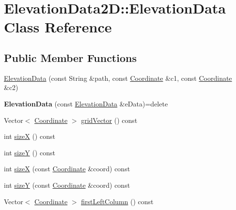 \hypertarget{classElevationData2D_1_1ElevationData}{}\section{Elevation\+Data2D\+:\+:Elevation\+Data Class Reference}
\label{classElevationData2D_1_1ElevationData}
\subsection*{Public Member Functions}
\begin{DoxyCompactItemize}
\item 
\mbox{\hyperlink{classElevationData2D_1_1ElevationData_ab6c477c8515de15f43e844c701c88f5b}{Elevation\+Data}} (const String \&path, const \mbox{\hyperlink{classElevationData2D_1_1Coordinate}{Coordinate}} \&c1, const \mbox{\hyperlink{classElevationData2D_1_1Coordinate}{Coordinate}} \&c2)
\item 
\mbox{\label{classElevationData2D_1_1ElevationData_a13b21b02c851a0521ba2591609158964}} 
{\bfseries Elevation\+Data} (const \mbox{\hyperlink{classElevationData2D_1_1ElevationData}{Elevation\+Data}} \&e\+Data)=delete
\item 
Vector$<$ \mbox{\hyperlink{classElevationData2D_1_1Coordinate}{Coordinate}} $>$ \mbox{\hyperlink{classElevationData2D_1_1ElevationData_af0514b1f341d0284e05547e3dd19b644}{grid\+Vector}} () const
\item 
int \mbox{\hyperlink{classElevationData2D_1_1ElevationData_a058ce71c9949c9bb0ce9a933a60dcc4d}{sizeX}} () const
\item 
int \mbox{\hyperlink{classElevationData2D_1_1ElevationData_af99f1d5cdcf994d9f8f3cc725f9393c2}{sizeY}} () const
\item 
int \mbox{\hyperlink{classElevationData2D_1_1ElevationData_a171ff10d701d61b375a8d9a4e49d696e}{sizeX}} (const \mbox{\hyperlink{classElevationData2D_1_1Coordinate}{Coordinate}} \&coord) const
\item 
int \mbox{\hyperlink{classElevationData2D_1_1ElevationData_a075227f3e6d08be154fe45f7900a3f76}{sizeY}} (const \mbox{\hyperlink{classElevationData2D_1_1Coordinate}{Coordinate}} \&coord) const
\item 
Vector$<$ \mbox{\hyperlink{classElevationData2D_1_1Coordinate}{Coordinate}} $>$ \mbox{\hyperlink{classElevationData2D_1_1ElevationData_ae4dfbc8a44b10da71d2d2c44072ced64}{first\+Left\+Column}} () const

\end{DoxyCompactItemize}
